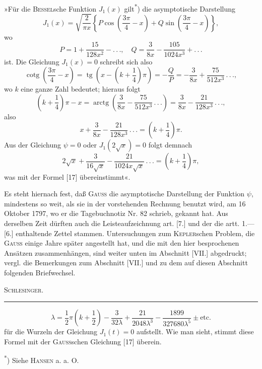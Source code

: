 \clearpage{}
\indent »Für die \textsc{Bessel}sche Funktion \(J_1(x)\) gilt\textsuperscript{*}) die asymptotische Darstellung
\[
J_1(x)=\sqrt{\frac2{\pi x}}\left\{P\cos\left(\frac{3\pi}4-x\right)+Q\sin\left(\frac{3\pi}4-x\right)\right\},
\]
\noindent wo
\[
P=1+\frac{15}{128x^2}-{.}\,{.}\,{.},\quad Q=\frac3{8x}-\frac{105}{1024x^3}+{.}\,{.}\,{.}
\]
\noindent ist. Die Gleichung \(J_1(x)=0\) schreibt sich also
\[
\operatorname{cotg}\left(\frac{3\pi}4-x\right)=\operatorname{tg}\left(x-\left(k+\frac14\right)\pi\right)=-\frac QP=-\frac3{8x}+\frac{75}{512x^3}\,{.}\,{.}\,{.},
\]
\noindent wo \(k\) eine ganze Zahl bedeutet; hieraus folgt
\[
\left(k+\frac14\right)\pi-x=\operatorname{arctg}\left(\frac3{8x}-\frac{75}{512x^3}\,{.}\,{.}\,{.}\right)=\frac3{8x}-\frac{21}{128x^3}\,{.}\,{.}\,{.},
\]
\noindent also
\[
x+\frac3{8x}-\frac{21}{128x^3}\,{.}\,{.}\,{.}=\left(k+\frac14\right)\pi.
\]
\noindent Aus der Gleichung \(\psi=0\) oder \(J_1(2\sqrt{x})=0\) folgt demnach
\[
2\sqrt{x}+\frac3{16\sqrt{x}}-\frac{21}{1024x\sqrt{x}}\,{.}\,{.}\,{.}=\left(k+\frac14\right)\pi,
\]
\noindent was mit der Formel [17] übereinstimmt«.

\indent Es steht hiernach fest, daß \textsc{Gauss} die asymptotische Darstellung der Funktion \(\psi\), mindestens so weit, als sie in der vorstehenden Rechnung benutzt wird, am 16 Oktober 1797, wo er die Tagebuchnotiz Nr. 82 schrieb, gekannt hat. Aus derselben Zeit dürften auch die Leisteaufzeichnung art. [7.] und der die artt. 1.—[6.] enthaltende Zettel stammen. Untersuchungen zum \textsc{Kepler}schen Problem, die \textsc{Gauss} einige Jahre später angestellt hat, und die mit den hier besprochenen Ansätzen zusammenhängen, sind weiter unten im Abschnitt [VII.] abgedruckt; vergl. die Bemerkungen zum Abschnitt [VII.] und zu dem auf diesen Abschnitt folgenden Briefwechsel.
\begin{flushright}\textsc{Schlesinger}.\end{flushright}
\par\medskip\noindent\rule{.24\linewidth}{.4pt}\par\smallskip
{\footnotesize
\[
\lambda=\frac12\pi\left(k+\frac12\right)-\frac3{32\lambda}+\frac{21}{2048\lambda^3}-\frac{1899}{327680\lambda^5}\pm\text{etc.}
\]
\noindent für die Wurzeln der Gleichung \(J_1(t)=0\) aufstellt. Wie man sieht, stimmt diese Formel mit der \textsc{Gauss}schen Gleichung [17] überein.
\par\noindent\hspace*{\parindent}\textsuperscript{*}) Siehe \textsc{Hansen} a. a. O.
\par}
\ClosingRule
\clearpage\endgroup
